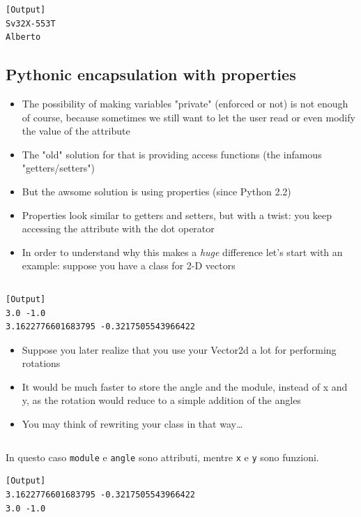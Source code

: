 \inputminted{python}{snippets/class_tv_private.py}

\begin{verbatim}
[Output]
Sv32X-553T
Alberto
\end{verbatim}

\subsection{Pythonic encapsulation with properties}

  \begin{itemize}
    \item The possibility of making variables "private" (enforced or not) is not enough of course,
          because sometimes we still want to let the user read or even modify the value of the attribute
    \item The "old" solution for that is providing access functions (the infamous "getters/setters")
    \item But the awsome solution is using \alert{properties} (since Python 2.2)
    \item Properties look similar to getters and setters, but with a twist: you keep
          accessing the attribute with the dot operator
    \item In order to understand why this makes a \emph{huge} difference let's 
          start with an example: suppose you have a class for 2-D vectors
  \end{itemize}

\inputminted{python}{snippets/vector2d_xy.py}

\begin{verbatim}
[Output]
3.0 -1.0
3.1622776601683795 -0.3217505543966422
\end{verbatim}

\begin{itemize}
    \item Suppose you later realize that you use your Vector2d a lot for performing rotations
    \item It would be much faster to store the angle and the module, instead of x and y,
          as the rotation would reduce to a simple addition of the angles
    \item You may think of rewriting your class in that way\dots
  \end{itemize}

\inputminted{python}{snippets/vector2d_rtheta.py}
\noindent In questo caso \texttt{module} e \texttt{angle} sono attributi, mentre \texttt{x} e \texttt{y} sono funzioni.
\begin{verbatim}
[Output]
3.1622776601683795 -0.3217505543966422
3.0 -1.0
\end{verbatim}

